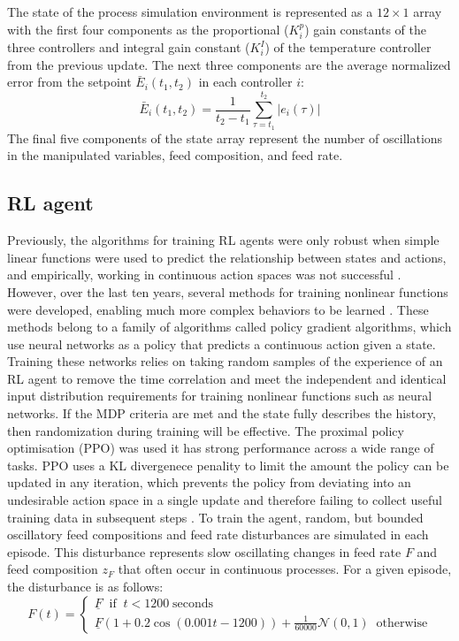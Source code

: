 The state of the process simulation environment is represented as a $12\times 1$ array with the first four components as the proportional ($K_i^p$) gain constants of the three controllers and integral gain constant ($K_i^I$) of the temperature controller from the previous update. The next three components are the average normalized error from the setpoint $\bar E_i(t_1,t_2)$ in each controller $i$:
\begin{equation}
	\bar E_i(t_1, t_2) =\frac{1}{t_2-t_1}\sum_{\tau=t_1}^{t_2} \lvert e_i(\tau) \rvert
\end{equation}
The final five components of the state array represent the number of oscillations in the manipulated variables, feed composition, and feed rate. 

\subsection{RL agent}
Previously, the algorithms for training RL agents were only robust when simple linear functions were used to predict the relationship between states and actions, and empirically, working in continuous action spaces was not successful \cite{Sutton2018}. However, over the last ten years, several methods for training nonlinear functions were developed, enabling much more complex behaviors to be learned \cite{Mnih2013, Lillicrap2016}. These methods belong to a family of algorithms called policy gradient algorithms, which use neural networks as a policy that predicts a continuous action given a state. Training these networks relies on taking random samples of the experience of an RL agent to remove the time correlation and meet the independent and identical input distribution requirements for training nonlinear functions such as neural networks. If the MDP criteria are met and the state fully describes the history, then randomization during training will be effective. The proximal policy optimisation (PPO) was used \cite{Schulman2017} it has strong performance across a wide range of tasks. PPO uses a KL divergenece penality to limit the amount the policy can be updated in any iteration, which prevents the policy from deviating into an undesirable action space in a single update and therefore failing to collect useful training data in subsequent steps \cite{Schulman2017, Engstrom2020}. To train the agent, random, but bounded oscillatory feed compositions and feed rate disturbances are simulated in each episode. This disturbance represents slow oscillating changes in feed rate $F$ and feed composition $z_F$ that often occur in continuous processes. For a given episode, the disturbance is as follows:
\begin{equation}
	F(t) = 
	\begin{cases}
		\underline F \;\; \text{if}\;\; t < 1200 \;\text{seconds} \\
		\underline F(1+ 0.2\cos(0.001t-1200))+\frac{1}{60000} \mathcal{N}(0,1) \;\; \text{otherwise}
	\end{cases}
\end{equation}

